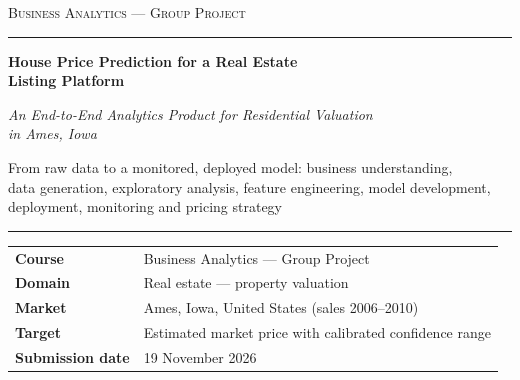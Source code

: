 \begin{titlepage}
\thispagestyle{empty}
\centering
\vspace*{1.2cm}

{\small\scshape Business Analytics --- Group Project\par}
\vspace{0.35cm}
{\color{black!55}\rule{\linewidth}{0.9pt}\par}

\vspace{1.6cm}
{\LARGE\bfseries House Price Prediction for a Real Estate\\[0.25em] Listing Platform\par}

\vspace{0.9cm}
{\large\itshape An End-to-End Analytics Product for Residential Valuation\\[0.15em]
in Ames, Iowa\par}

\vspace{0.4cm}
{\normalsize From raw data to a monitored, deployed model: business understanding,\\
data generation, exploratory analysis, feature engineering, model development,\\
deployment, monitoring and pricing strategy\par}

\vspace{0.5cm}
{\color{black!55}\rule{\linewidth}{0.9pt}\par}

\vfill

\begin{minipage}{0.86\linewidth}
\centering
\renewcommand{\arraystretch}{1.35}
\begin{tabular}{@{}p{3.4cm}l@{}}
\toprule
\textbf{Course} & Business Analytics --- Group Project \\
\textbf{Domain} & Real estate --- property valuation \\
\textbf{Market} & Ames, Iowa, United States (sales 2006--2010) \\
\textbf{Target} & Estimated market price with calibrated confidence range \\
\textbf{Submission date} & 19 November 2026 \\
\bottomrule
\end{tabular}
\end{minipage}


\end{titlepage}

